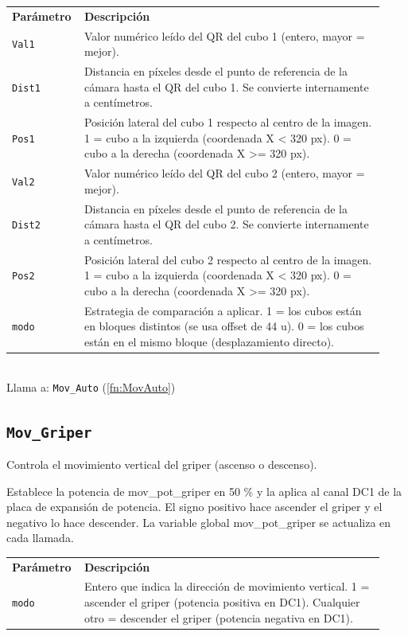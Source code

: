 \begin{tabular}{@{}p{0.15\linewidth}p{0.78\linewidth}@{}}
\textbf{Par\'ametro} & \textbf{Descripci\'on} \\
\texttt{Val1} & Valor numérico leído del QR del cubo 1 (entero, mayor = mejor). \\
\texttt{Dist1} & Distancia en píxeles desde el punto de referencia de la cámara hasta el QR del cubo 1. Se convierte internamente a centímetros. \\
\texttt{Pos1} & Posición lateral del cubo 1 respecto al centro de la imagen. 1 = cubo a la izquierda (coordenada X < 320 px). 0 = cubo a la derecha  (coordenada X >= 320 px). \\
\texttt{Val2} & Valor numérico leído del QR del cubo 2 (entero, mayor = mejor). \\
\texttt{Dist2} & Distancia en píxeles desde el punto de referencia de la cámara hasta el QR del cubo 2. Se convierte internamente a centímetros. \\
\texttt{Pos2} & Posición lateral del cubo 2 respecto al centro de la imagen. 1 = cubo a la izquierda (coordenada X < 320 px). 0 = cubo a la derecha  (coordenada X >= 320 px). \\
\texttt{modo} & Estrategia de comparación a aplicar. 1 = los cubos están en bloques distintos (se usa offset de 44 u). 0 = los cubos están en el mismo bloque (desplazamiento directo). \\
\end{tabular}\\[4pt]
Llama a: \texttt{Mov\_Auto} (\ref{fn:MovAuto})\\

\subsection{\texttt{Mov\_Griper}}
\label{fn:MovGriper}
Controla el movimiento vertical del griper (ascenso o descenso).

Establece la potencia de mov\_pot\_griper en 50 \% y la aplica al canal DC1 de la placa de expansión de potencia. El signo positivo hace ascender el griper y el negativo lo hace descender. La variable global mov\_pot\_griper se actualiza en cada llamada.

\begin{tabular}{@{}p{0.15\linewidth}p{0.78\linewidth}@{}}
\textbf{Par\'ametro} & \textbf{Descripci\'on} \\
\texttt{modo} & Entero que indica la dirección de movimiento vertical. 1              = ascender el griper (potencia positiva en DC1). Cualquier otro = descender el griper (potencia negativa en DC1). \\
\end{tabular}\\[4pt]

